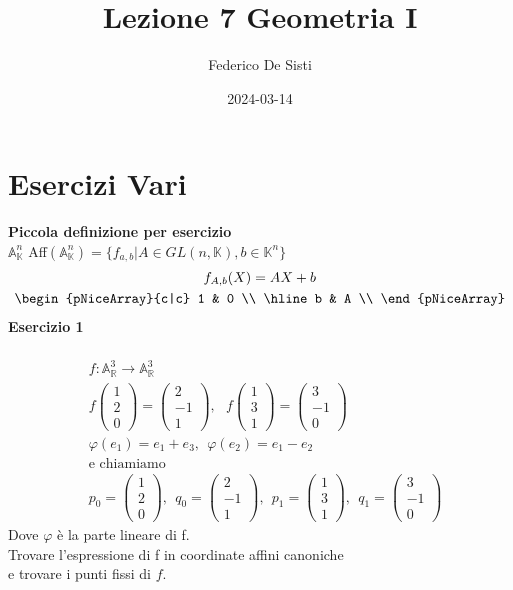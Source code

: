 \documentclass[12px]{article}
\title{Lezione 7 Geometria I}
\date{2024-03-14}
\author{Federico De Sisti}
\theoremstyle{break}
\theoremstyle{break}
\theoremstyle{break}
\theoremstyle{break}
\theoremstyle{break}
\theoremstyle{break}
\newcommand{\icol}[1]{%
  \left(\begin{smallmatrix}#1\end{smallmatrix}\right)%
}
\begin{document}
	\maketitle
	\newpage
	\section{Esercizi Vari}
	\textbf{Piccola definizione per esercizio}\\
	$ \mathbb{A}^n_ \mathbb{K}$   Aff$ (\mathbb{A} ^n_ \mathbb{K}) = \{f_{a,b}| A\in GL(n, \mathbb{K}), b\in \mathbb{K}^n\}$
\begin{gather*}
	f_{A,b}(X) = AX + b \\
	\begin{pNiceArray}{c|c}
		1 & 0 \\
		\hline
		b & A \\
	\end{pNiceArray} \\
\end{gather*}
\textbf{Esercizio 1}\\
\hline \ \\ 
\begin{align*}
	&f: \mathbb{A}^3_{\mathbb{R}} \rightarrow \mathbb{A}^3_{\mathbb{R}}\\
	&f\icol{1\\2\\0} = \icol{2\\-1\\1}, \ \ \ f\icol{1\\3\\1} = \icol{3\\-1\\0} \\
	&\varphi(e_1) = e_1+e_3, \ \ \varphi(e_2) = e_1-e_2 \\
	& \text{e chiamiamo} \\
	&p_0 = \icol{1\\2\\0}, \ \ q_0 = \icol{2\\-1\\1}, \ \ p_1 = \icol{1\\3\\1}, \ \ q_1 = \icol{3\\-1\\0}
\end{align*}
Dove $\varphi$ è la parte lineare di f.\\
Trovare l'espressione di f in coordinate affini canoniche \\e trovare i punti fissi  di $f$.\\
\end{document}
